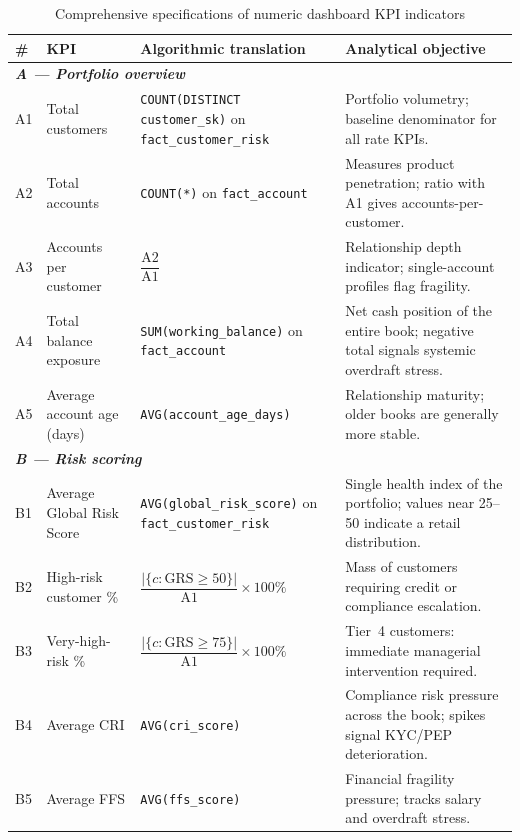\begin{table}[H]
\centering
\caption{Comprehensive specifications of numeric dashboard KPI indicators}
\label{tab:kpis_chiffres}
\renewcommand{\arraystretch}{1.22}
\scriptsize
\begin{tabular}{|p{0.6cm}|p{3.0cm}|p{5.1cm}|p{5.6cm}|}
\hline
\rowcolor{blue!15}
\textbf{\#} & \textbf{KPI} & \textbf{Algorithmic translation} & \textbf{Analytical objective} \\
\hline
\multicolumn{4}{|l|}{\cellcolor{blue!8}\textit{\textbf{A --- Portfolio overview}}} \\
\hline
A1 & Total customers & \texttt{COUNT(DISTINCT customer\_sk)} on \texttt{fact\_customer\_risk} & Portfolio volumetry; baseline denominator for all rate KPIs. \\
\hline
A2 & Total accounts & \texttt{COUNT(*)} on \texttt{fact\_account} & Measures product penetration; ratio with A1 gives accounts-per-customer. \\
\hline
A3 & Accounts per customer & $\dfrac{\text{A2}}{\text{A1}}$ & Relationship depth indicator; single-account profiles flag fragility. \\
\hline
A4 & Total balance exposure & \texttt{SUM(working\_balance)} on \texttt{fact\_account} & Net cash position of the entire book; negative total signals systemic overdraft stress. \\
\hline
A5 & Average account age (days) & \texttt{AVG(account\_age\_days)} & Relationship maturity; older books are generally more stable. \\
\hline
\multicolumn{4}{|l|}{\cellcolor{blue!8}\textit{\textbf{B --- Risk scoring}}} \\
\hline
B1 & Average Global Risk Score & \texttt{AVG(global\_risk\_score)} on \texttt{fact\_customer\_risk} & Single health index of the portfolio; values near 25--50 indicate a retail distribution. \\
\hline
B2 & High-risk customer \% & $\dfrac{|\{c:\mathrm{GRS}\ge 50\}|}{\text{A1}}\times 100\%$ & Mass of customers requiring credit or compliance escalation. \\
\hline
B3 & Very-high-risk \% & $\dfrac{|\{c:\mathrm{GRS}\ge 75\}|}{\text{A1}}\times 100\%$ & Tier~4 customers: immediate managerial intervention required. \\
\hline
B4 & Average CRI & \texttt{AVG(cri\_score)} & Compliance risk pressure across the book; spikes signal KYC/PEP deterioration. \\
\hline
B5 & Average FFS & \texttt{AVG(ffs\_score)} & Financial fragility pressure; tracks salary and overdraft stress. \\

\end{tabular}
\end{table}
